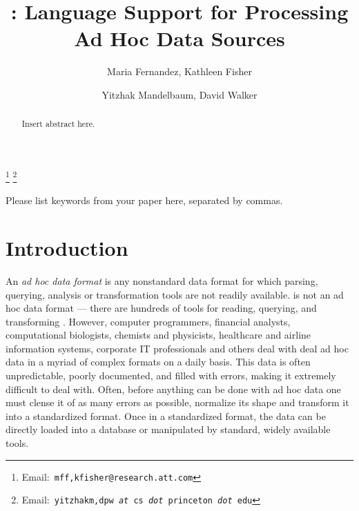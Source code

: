\documentclass{entcs}
\begin{document}
\begin{frontmatter}
  \title{\datatype{}: Language Support for Processing Ad Hoc Data Sources} 
  \author{Maria Fernandez,
    Kathleen Fisher}
  \address{AT\&T\\ 
    Florham Park,NJ USA} 
  \author{Yitzhak Mandelbaum,
    David Walker}
  \address{Department of Computer Science\\ 
    Princeton University\\
    Princeton,NJ USA} 
  \thanks[attemail]{Email:\texttt{\normalshape
        mff,kfisher@research.att.com}}
  \thanks[premail]{Email:\texttt{\normalshape
        yitzhakm,dpw {\it at} cs {\it dot} princeton {\it dot} edu}}
\begin{abstract} 
  Insert abstract here.
\end{abstract}
\begin{keyword}
  Please list keywords from your paper here, separated by commas.
\end{keyword}
\end{frontmatter}

\section{Introduction}
\label{intro}

An {\em ad hoc data format} is any nonstandard data format for which
parsing, querying, analysis or transformation tools are not readily
available.  \xml{} is not an ad hoc data format --- there are hundreds
of tools for reading, querying, and transforming \xml{}.  However,
computer programmers, financial analysts, computational biologists,
chemists and physicists, healthcare and airline information systems,
corporate IT professionals and others deal with deal ad hoc data in a
myriad of complex formats on a daily basis.  This data is often
unpredictable, poorly documented, and filled with errors, making it
extremely difficult to deal with.  Often, before anything can be done
with ad hoc data one must clense it of as many errors as possible,
normalize its shape and transform it into a standardized format.  Once
in a standardized format, the data can be directly loaded into a
database or manipulated by standard, widely available tools.

\end{document}
